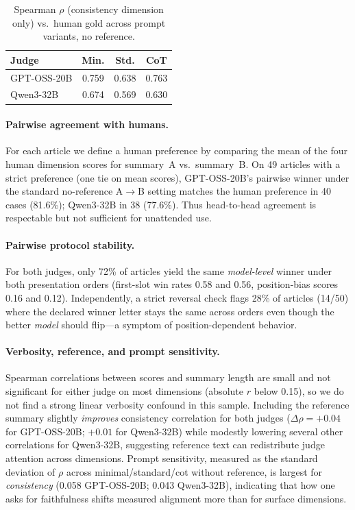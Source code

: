\documentclass[11pt]{article}
\begin{document}
\begin{table}[t]
\centering
\footnotesize
\begin{tabular}{@{}lccc@{}}
\toprule
Judge & Min. & Std. & CoT \\
\midrule
GPT-OSS-20B & 0.759 & 0.638 & 0.763 \\
Qwen3-32B & 0.674 & 0.569 & 0.630 \\
\bottomrule
\end{tabular}
\caption{Spearman $\rho$ (consistency dimension only) vs.\ human gold across prompt variants, no reference.}
\label{tab:promptcons}
\end{table}

\paragraph{Pairwise agreement with humans.}
For each article we define a human preference by comparing the mean of the four human dimension scores for summary~A vs.\ summary~B. On 49 articles with a strict preference (one tie on mean scores), GPT-OSS-20B's pairwise winner under the standard no-reference A$\rightarrow$B setting matches the human preference in 40 cases (81.6\%); Qwen3-32B in 38 (77.6\%). Thus head-to-head agreement is respectable but not sufficient for unattended use.

\paragraph{Pairwise protocol stability.}
For both judges, only 72\% of articles yield the same \emph{model-level} winner under both presentation orders (first-slot win rates 0.58 and 0.56, position-bias scores 0.16 and 0.12). Independently, a strict reversal check flags 28\% of articles (14/50) where the declared winner letter stays the same across orders even though the better \emph{model} should flip---a symptom of position-dependent behavior.

\paragraph{Verbosity, reference, and prompt sensitivity.}
Spearman correlations between scores and summary length are small and not significant for either judge on most dimensions (absolute $r$ below 0.15), so we do not find a strong linear verbosity confound in this sample. Including the reference summary slightly \emph{improves} consistency correlation for both judges ($\Delta\rho{=}{+}0.04$ for GPT-OSS-20B; ${+}0.01$ for Qwen3-32B) while modestly lowering several other correlations for Qwen3-32B, suggesting reference text can redistribute judge attention across dimensions. Prompt sensitivity, measured as the standard deviation of $\rho$ across minimal/standard/cot without reference, is largest for \emph{consistency} (0.058 GPT-OSS-20B; 0.043 Qwen3-32B), indicating that how one asks for faithfulness shifts measured alignment more than for surface dimensions.
\end{document}
